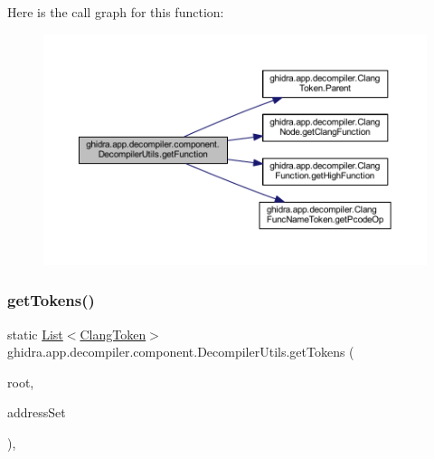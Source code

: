 Here is the call graph for this function\+:
\nopagebreak
\begin{figure}[H]
\begin{center}
\leavevmode
\includegraphics[width=350pt]{classghidra_1_1app_1_1decompiler_1_1component_1_1_decompiler_utils_a57a704c884b7f65374e0390f5e101084_cgraph}
\end{center}
\end{figure}
\mbox{\label{classghidra_1_1app_1_1decompiler_1_1component_1_1_decompiler_utils_af2e187292506b0eb6ba118c18b49ee2e}} 
\subsubsection{\texorpdfstring{getTokens()}{getTokens()}\hspace{0.1cm}{\footnotesize\ttfamily [1/2]}}
{\footnotesize\ttfamily static \mbox{\hyperlink{xml_8hh_ab5ab62f46b3735557c125f91b40ac155}{List}}$<$\mbox{\hyperlink{classghidra_1_1app_1_1decompiler_1_1_clang_token}{Clang\+Token}}$>$ ghidra.\+app.\+decompiler.\+component.\+Decompiler\+Utils.\+get\+Tokens (\begin{DoxyParamCaption}\item[{\mbox{\hyperlink{interfaceghidra_1_1app_1_1decompiler_1_1_clang_node}{Clang\+Node}}}]{root,  }\item[{Address\+Set\+View}]{address\+Set }\end{DoxyParamCaption})\hspace{0.3cm}{\ttfamily [inline]}, {\ttfamily [static]}}

